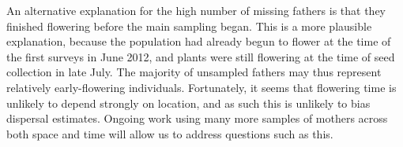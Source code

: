 \documentclass[10pt, a4paper, twocolumn]{article} %
\begin{document}
An alternative explanation for the high number of missing fathers is that they finished flowering before the main sampling began.
This is a more plausible explanation, because the population had already begun to flower at the time of the first surveys in June 2012, and plants were still flowering at the time of seed collection in late 
July.
The majority of unsampled fathers may thus represent relatively early-flowering individuals.
Fortunately, it seems that flowering time is unlikely to depend strongly on location, and as such this is unlikely to bias dispersal estimates.
Ongoing work using many more samples of mothers across both space and time will allow us to address questions such as this.



\end{document}
